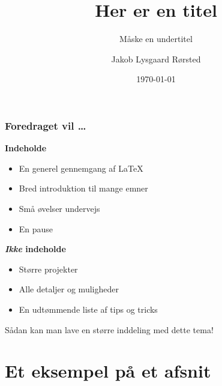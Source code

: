 \documentclass[handout]{beamer}
\title{Her er en titel}
\subtitle{\small Måske en undertitel}
\author{Jakob Lysgaard Rørsted}
\date{\today}
\institute{%
  Aarhus Universitet
}
\newcommand{\plainbreak}[1]{\vspace{#1\baselineskip}}
\begin{document}
\begin{frame}[plain]

  \maketitle

\end{frame}


\begin{frame}
  \frametitle{Foredraget vil \dots}

  \textbf{Indeholde}
  \begin{itemize}
  \item En generel gennemgang af \LaTeX{}
  \item Bred introduktion til \alert{mange} emner
  \item Små øvelser undervejs
  \item En pause
  \end{itemize}

  \plainbreak1
  \pause

  \textbf{\textsl{Ikke} indeholde}
  \begin{itemize}
  \item Større projekter
  \item Alle detaljer og muligheder
  \item En udtømmende liste af tips og tricks
  \end{itemize}

\end{frame}


\begin{frame}[standout]
  Sådan kan man lave en større inddeling med dette tema!
\end{frame}


\section{Et eksempel på et afsnit}
\end{document}
